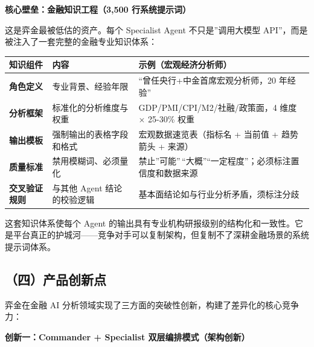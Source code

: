 \documentclass[
]{ctexart}
\begin{document}
\textbf{核心壁垒：金融知识工程（3,500 行系统提示词）}

这是弈金最被低估的资产。每个 Specialist Agent 不只是''调用大模型
API''，而是被注入了一套完整的金融专业知识体系：

\begin{longtable}[]{@{}
  >{\raggedright\arraybackslash}p{}
  >{\raggedright\arraybackslash}p{}
  >{\raggedright\arraybackslash}p{}@{}}
\toprule\noalign{}
\begin{minipage}[b]{\linewidth}\raggedright
知识组件
\end{minipage} & \begin{minipage}[b]{\linewidth}\raggedright
内容
\end{minipage} & \begin{minipage}[b]{\linewidth}\raggedright
示例（宏观经济分析师）
\end{minipage} \\
\midrule\noalign{}
\endhead
\bottomrule\noalign{}
\endlastfoot
\textbf{角色定义} & 专业背景、经验年限 &
``曾任央行+中金首席宏观分析师，20 年经验'' \\
\textbf{分析框架} & 标准化的分析维度与权重 &
GDP/PMI/CPI/M2/社融/政策面，4 维度 × 25-30\% 权重 \\
\textbf{输出模板} & 强制输出的表格字段和格式 & 宏观数据速览表（指标名 +
当前值 + 趋势箭头 + 来源） \\
\textbf{质量标准} & 禁用模糊词、必须量化 &
禁止''可能''\,``大概''``一定程度''；必须标注置信度和数据来源 \\
\textbf{交叉验证规则} & 与其他 Agent 结论的校验逻辑 &
基本面结论如与行业分析矛盾，须标注分歧 \\
\end{longtable}


这套知识体系使每个 Agent
的输出具有专业机构研报级别的结构化和一致性。它是平台真正的护城河------竞争对手可以复制架构，但复制不了深耕金融场景的系统提示词体系。

\subsection{（四）产品创新点}\label{ux56dbux4ea7ux54c1ux521bux65b0ux70b9}

弈金在金融 AI
分析领域实现了三方面的突破性创新，构建了差异化的核心竞争力：

\textbf{创新一：Commander + Specialist 双层编排模式（架构创新）}
\end{document}
